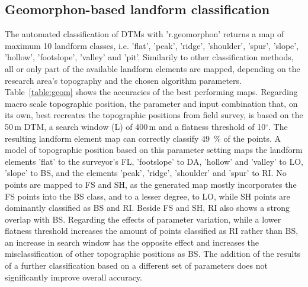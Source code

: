 \documentclass[preprint,12pt,authoryear]{elsarticle}
\begin{document}
\subsection{Geomorphon-based landform classification}
The automated classification of DTMs with 'r.geomorphon' returns a map of maximum 10 landform classes, i.e. 'flat', 'peak', 'ridge', 'shoulder', 'spur', 'slope', 'hollow', 'footslope', 'valley' and 'pit'. Similarily to other classification methods, all or only part of the available landform elements are mapped, depending on the research area's topography and the chosen algorithm parameters. Table~\ref{table:geom} shows the accuracies of the best performing maps.
Regarding macro scale topographic position, the parameter and input combination that, on its own, best recreates the topographic positions from field survey, is based on the 50\,m DTM, a search window (L) of 400\,m and a flatness threshold of 10$^{\circ}$. The resulting landform element map can correctly classify 49~\% of the points. A model of topographic position based on this parameter setting maps the landform elements 'flat' to the surveyor's FL, 'footslope' to DA,  'hollow' and 'valley' to LO, 'slope' to BS, and the elements 'peak', 'ridge', 'shoulder' and 'spur' to RI. No points are mapped to FS and SH, as the generated map mostly incorporates the FS points into the BS class, and to a lesser degree, to LO, while SH points are dominantly classified as BS and RI. Beside FS  and SH, RI also shows a strong overlap with BS. Regarding the effects of parameter variation, while a lower flatness threshold increases the amount of points classified as RI rather than BS, an increase in search window has the opposite effect and increases the misclassification of other topographic positions as BS. The addition of the results of a further classification based on a different set of parameters does not significantly improve overall accuracy.
\end{document}

